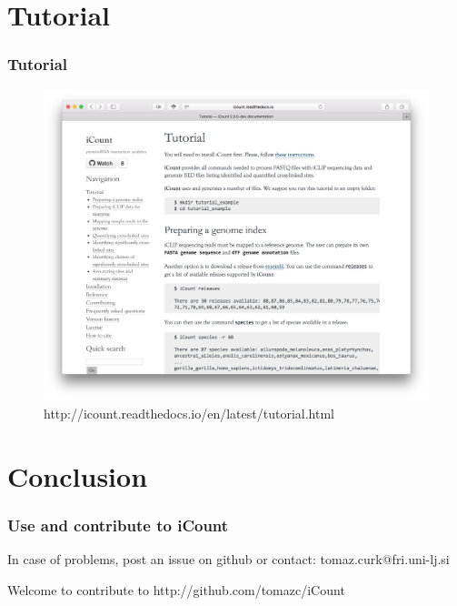 \documentclass{beamer}
\newif\ifplacelogo %
\begin{document}
\section{Tutorial}
\begin{frame}
\frametitle{Tutorial}

\begin{figure}
\begin{center}
    \includegraphics[width=0.65\linewidth]{images/tutorial.png}
    \caption{http://icount.readthedocs.io/en/latest/tutorial.html}
\end{center}
\end{figure}

\end{frame}


\section{Conclusion}

\placelogotrue

\begin{frame}
\frametitle{Use and contribute to iCount}
\centering

In case of problems, post an issue on github or contact: tomaz.curk@fri.uni-lj.si

Welcome to contribute to http://github.com/tomazc/iCount

\end{frame}
\end{document}
